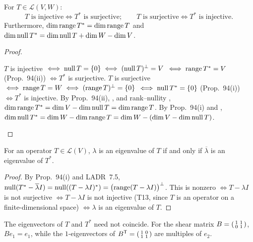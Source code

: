 \documentclass[10pt]{scrartcl}
\newcommand{\LL}{\mathcal L}\newcommand{\PP}{\mathcal P}\newcommand{\MM}{\mathcal M}
\begin{document}
\begin{proposition*}
  For $T\in\LL(V,W)$:
  \[
    T \text{ is injective} \iff T^* \text{ is surjective}; \qquad
    T \text{ is surjective} \iff T^* \text{ is injective}.
  \]
  Furthermore, $\dim\operatorname{range} T^* = \dim\operatorname{range} T$ and $\dim\operatorname{null} T^* = \dim\operatorname{null} T + \dim W - \dim V$.
\end{proposition*}
\begin{proof}
  \begin{steps}
    \ii $T$ is injective $\iff \operatorname{null} T=\{0\} \iff (\operatorname{null} T)^\perp=V$  $\iff \operatorname{range} T^*=V$ (Prop.~94(ii)) $\iff T^*$ is surjective.
    \ii $T$ is surjective $\iff \operatorname{range} T=W \iff (\operatorname{range} T)^\perp=\{0\}$  $\iff \operatorname{null} T^*=\{0\}$ (Prop.~94(i)) $\iff T^*$ is injective.
    \ii By Prop.~94(ii), , and rank--nullity , $\dim\operatorname{range} T^* = \dim V - \dim\operatorname{null} T = \dim\operatorname{range} T$.
    \ii By Prop.~94(i) and , $\dim\operatorname{null} T^* = \dim W - \dim\operatorname{range} T = \dim W - (\dim V - \dim\operatorname{null} T)$.
  \end{steps}
\end{proof}

\begin{proposition*}
  For an operator $T\in\LL(V)$, $\lambda$ is an eigenvalue of $T$ if and only if $\overline{\lambda}$ is an eigenvalue of $T^*$.
\end{proposition*}
\begin{proof}
  By Prop.~94(i) and LADR~7.5, $\operatorname{null}(T^*-\overline{\lambda}I)=\operatorname{null}((T-\lambda I)^*)=\bigl(\operatorname{range}(T-\lambda I)\bigr)^\perp$. This is nonzero $\iff T-\lambda I$ is not surjective $\iff T-\lambda I$ is not injective (T13, since $T$ is an operator on a finite-dimensional space) $\iff \lambda$ is an eigenvalue of $T$.
\end{proof}

The eigenvectors of $T$ and $T^*$ need not coincide. For the shear matrix $B=\begin{psmallmatrix}1&1\\0&1\end{psmallmatrix}$, $Be_1=e_1$, while the $1$-eigenvectors of $B^{\mathsf T}=\begin{psmallmatrix}1&0\\1&1\end{psmallmatrix}$ are multiples of $e_2$.
\end{document}
